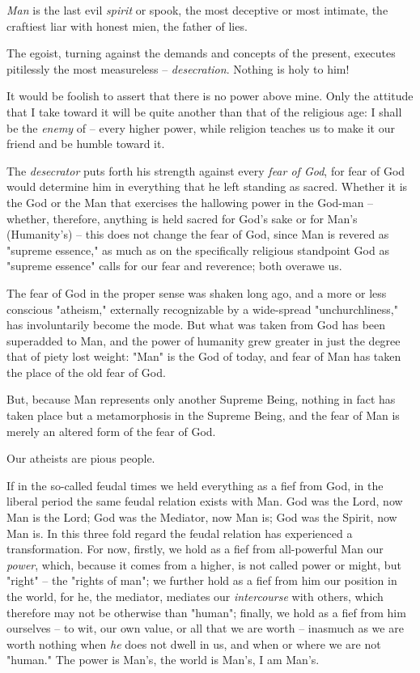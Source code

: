 \documentclass[a4paper]{book}
\begin{document}
\textit{Man} is the last evil \textit{spirit} or spook, the most deceptive or 
most intimate, the craftiest liar with honest mien, the father of lies.

The egoist, turning against the demands and concepts of the present, executes 
pitilessly the most measureless -- \textit{desecration}. Nothing is holy to 
him!

It would be foolish to assert that there is no power above mine. Only the 
attitude that I take toward it will be quite another than that of the 
religious age: I shall be the \textit{enemy} of -- every higher power, while 
religion teaches us to make it our friend and be humble toward it.

The \textit{desecrator} puts forth his strength against every \textit{fear of 
God}, for fear of God would determine him in everything that he left standing 
as sacred. Whether it is the God or the Man that exercises the hallowing power 
in the God-man -- whether, therefore, anything is held sacred for God's sake 
or for Man's (Humanity's) -- this does not change the fear of God, since Man 
is revered as "{}supreme essence,"{} as much as on the specifically religious 
standpoint God as "{}supreme essence"{} calls for our fear and reverence; both 
overawe us.

The fear of God in the proper sense was shaken long ago, and a more or less 
conscious "{}atheism,"{} externally recognizable by a wide-spread 
"{}unchurchliness,"{} has involuntarily become the mode. But what was taken 
from God has been superadded to Man, and the power of humanity grew greater in 
just the degree that of piety lost weight: "{}Man"{} is the God of today, and 
fear of Man has taken the place of the old fear of God.

But, because Man represents only another Supreme Being, nothing in fact has 
taken place but a metamorphosis in the Supreme Being, and the fear of Man is 
merely an altered form of the fear of God.

Our atheists are pious people.

If in the so-called feudal times we held everything as a fief from God, in the 
liberal period the same feudal relation exists with Man. God was the Lord, now 
Man is the Lord; God was the Mediator, now Man is; God was the Spirit, now Man 
is. In this three fold regard the feudal relation has experienced a 
transformation. For now, firstly, we hold as a fief from all-powerful Man our 
\textit{power}, which, because it comes from a higher, is not called power or 
might, but "{}right"{} -- the "{}rights of man"{}; we further hold as a fief 
from him our position in the world, for he, the mediator, mediates our 
\textit{intercourse} with others, which therefore may not be otherwise than 
"{}human"{}; finally, we hold as a fief from him ourselves -- to wit, our own 
value, or all that we are worth -- inasmuch as we are worth nothing when 
\textit{he} does not dwell in us, and when or where we are not "{}human."{} 
The power is Man's, the world is Man's, I am Man's.
\end{document}
